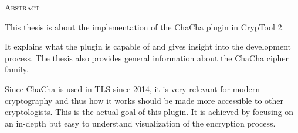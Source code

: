 
\begin{center}
  \textsc{Abstract}
\end{center}

\noindent
This thesis is about the implementation of the ChaCha plugin in CrypTool 2.

\medskip
\noindent
It explains what the plugin is capable of and gives insight into the development process. The thesis also provides general information about the ChaCha cipher family.

\medskip
\noindent
Since ChaCha is used in TLS since 2014, it is very relevant for modern cryptography and thus how it works should be made more accessible to other cryptologists. This is the actual goal of this plugin. It is achieved by focusing on an in-depth but easy to understand visualization of  the encryption process.

